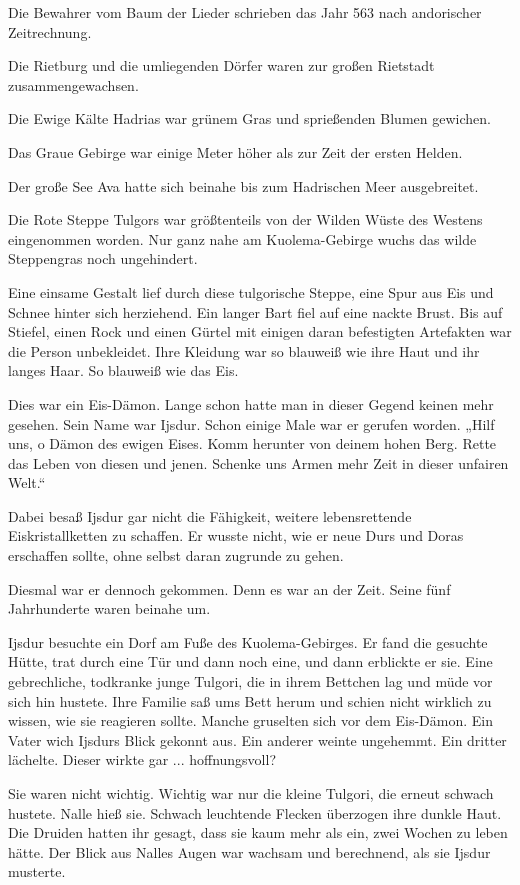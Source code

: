 
Die Bewahrer vom Baum der Lieder schrieben das Jahr 563 nach andorischer Zeitrechnung.

Die Rietburg und die umliegenden Dörfer waren zur großen Rietstadt zusammengewachsen.

Die Ewige Kälte Hadrias war grünem Gras und sprießenden Blumen gewichen.

Das Graue Gebirge war einige Meter höher als zur Zeit der ersten Helden.

Der große See Ava hatte sich beinahe bis zum Hadrischen Meer ausgebreitet.

Die Rote Steppe Tulgors war größtenteils von der Wilden Wüste des Westens eingenommen worden. Nur ganz nahe am Kuolema-Gebirge wuchs das wilde Steppengras noch ungehindert.

Eine einsame Gestalt lief durch diese tulgorische Steppe, eine Spur aus Eis und Schnee hinter sich herziehend. Ein langer Bart fiel auf eine nackte Brust. Bis auf Stiefel, einen Rock und einen Gürtel mit einigen daran befestigten Artefakten war die Person unbekleidet. Ihre Kleidung war so blauweiß wie ihre Haut und ihr langes Haar. So blauweiß wie das Eis.

Dies war ein Eis-Dämon. Lange schon hatte man in dieser Gegend keinen mehr gesehen. Sein Name war Ijsdur. Schon einige Male war er gerufen worden. „Hilf uns, o Dämon des ewigen Eises. Komm herunter von deinem hohen Berg. Rette das Leben von diesen und jenen. Schenke uns Armen mehr Zeit in dieser unfairen Welt.“

Dabei besaß Ijsdur gar nicht die Fähigkeit, weitere lebensrettende Eiskristallketten zu schaffen. Er wusste nicht, wie er neue Durs und Doras erschaffen sollte, ohne selbst daran zugrunde zu gehen.

Diesmal war er dennoch gekommen. Denn es war an der Zeit. Seine fünf Jahrhunderte waren beinahe um.

Ijsdur besuchte ein Dorf am Fuße des Kuolema-Gebirges. Er fand die gesuchte Hütte, trat durch eine Tür und dann noch eine, und dann erblickte er sie. Eine gebrechliche, todkranke junge Tulgori, die in ihrem Bettchen lag und müde vor sich hin hustete. Ihre Familie saß ums Bett herum und schien nicht wirklich zu wissen, wie sie reagieren sollte. Manche gruselten sich vor dem Eis-Dämon. Ein Vater wich Ijsdurs Blick gekonnt aus. Ein anderer weinte ungehemmt. Ein dritter lächelte. Dieser wirkte gar ... hoffnungsvoll?

Sie waren nicht wichtig. Wichtig war nur die kleine Tulgori, die erneut schwach hustete. Nalle hieß sie. Schwach leuchtende Flecken überzogen ihre dunkle Haut. Die Druiden hatten ihr gesagt, dass sie kaum mehr als ein, zwei Wochen zu leben hätte. Der Blick aus Nalles Augen war wachsam und berechnend, als sie Ijsdur musterte.

